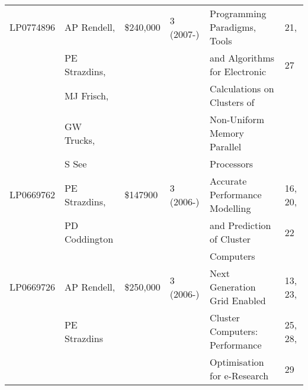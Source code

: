 \documentclass[a4paper,oneside,12pt]{article}
\begin{document}
\begin{center}
\begin{tabular}{|l|l|l|l|l|l|}
LP0774896 & AP Rendell, & \$240,000 & 3  (2007-) 
			    & Programming Paradigms, Tools  &  21, \\
	  & PE Strazdins, &&& and Algorithms for Electronic & 27 \\
	  & MJ Frisch,     &&&  Calculations on Clusters of  & \\
	  &  GW Trucks, &&& Non-Uniform Memory Parallel & \\
	  & S See &&& Processors & \\
\hline
LP0669762 & PE Strazdins, & \$147900 & 3 (2006-) 
			    & Accurate Performance Modelling & 16, 20, \\
	  & PD Coddington &&& and Prediction of Cluster & 22 \\
	  &		  &&& Computers & \\
\hline 
LP0669726 & AP Rendell,  & \$250,000 & 3 (2006-) 
			    & Next Generation Grid Enabled  & 13, 23, \\
	  & PE Strazdins &&& Cluster Computers: Performance & 25, 28, \\
	  &		 &&& Optimisation for e-Research & 29\\
\hline
\end{tabular}
\end{center}		
\end{document}
